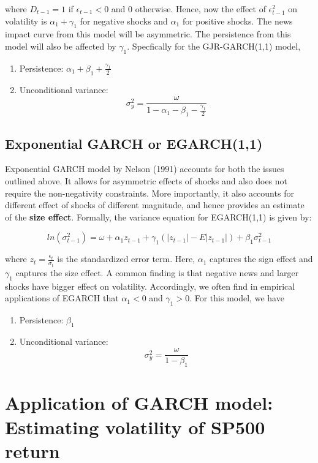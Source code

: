 \documentclass[]{book}
\theoremstyle{definition}
\theoremstyle{definition}
\theoremstyle{definition}
\theoremstyle{remark}
\begin{document}
where \(D_{t-1}=1\) if \(\epsilon_{t-1}<0\) and \(0\) otherwise. Hence, now the effect of \(\epsilon^2_{t-1}\) on volatility is \(\alpha_1+\gamma_1\) for negative shocks and \(\alpha_1\) for positive shocks. The news impact curve from this model will be asymmetric. The persistence from this model will also be affected by \(\gamma_1\). Specfically for the GJR-GARCH(1,1) model,

\begin{enumerate}
\def\labelenumi{\arabic{enumi}.}
\item
  Persistence: \(\alpha_1+\beta_1 +\frac{\gamma_1}{2}\)
\item
  Unconditional variance: \[\sigma^2_y = \frac{\omega}{1-\alpha_1-\beta_1-\frac{\gamma_1}{2}}\]
\end{enumerate}

\hypertarget{exponential-garch-or-egarch11}{%
\subsection{Exponential GARCH or EGARCH(1,1)}\label{exponential-garch-or-egarch11}}

Exponential GARCH model by Nelson (1991) accounts for both the issues outlined above. It allows for asymmetric effects of shocks and also does not require the non-negativity constraints. More importantly, it also accounts for different effect of shocks of different magnitude, and hence provides an estimate of the \textbf{size effect}. Formally, the variance equation for EGARCH(1,1) is given by:

\[ln(\sigma^2_{t-1})=\omega+ \alpha_1 z_{t-1} +\gamma_1 (|z_{t-1}|-E|z_{t-1}|) +\beta_1\sigma^2_{t-1}\]

where \(z_t=\frac{\epsilon_t}{\sigma_t}\) is the standardized error term. Here, \(\alpha_1\) captures the sign effect and \(\gamma_1\) captures the size effect. A common finding is that negative news and larger shocks have bigger effect on volatility. Accordingly, we often find in empirical applications of EGARCH that \(\alpha_1<0\) and \(\gamma_1>0\). For this model, we have

\begin{enumerate}
\def\labelenumi{\arabic{enumi}.}
\item
  Persistence: \(\beta_1\)
\item
  Unconditional variance: \[\sigma^2_y = \frac{\omega}{1-\beta_1}\]
\end{enumerate}

\hypertarget{application-of-garch-model-estimating-volatility-of-sp500-return}{%
\section{Application of GARCH model: Estimating volatility of SP500 return}\label{application-of-garch-model-estimating-volatility-of-sp500-return}}
\end{document}
